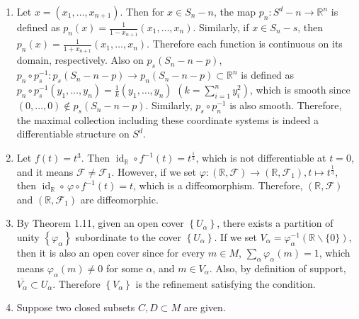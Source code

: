 \begin{enumerate}
\item Let $x=\left(x_{1}, \ldots, x_{n+1}\right)$. Then for $x \in S_{n}-n$, 
the map $p_{n}\colon S^{d}-n \rightarrow \mathbb{R}^{n}$ is defined as 
$p_{n}(x)=\frac{1}{1-x_{n+1}}\left(x_{1}, \ldots, x_{n}\right)$. 
Similarly, if $x \in S_{n}-s$, then $p_{n}(x)=\frac{1}{1+x_{n+1}}\left(x_{1}, \ldots, x_{n}\right)$. 
Therefore each function is continuous on its domain, respectively. 
Also on $p_{s}(S_{n}-n-p)$, $p_{n} \circ p_{s}^{-1}\colon p_{s}(S_{n}-n-p) \rightarrow p_{n}(S_{n}-n-p) \subset \mathbb{R}^{n}$ is defined as $p_{n} \circ p_{s}^{-1}(y_{1}, \ldots, y_{n})=\frac{1}{k}(y_{1}, \ldots, y_{n})$ $(k=\sum_{i=1}^{n} y_{i}^{2})$, 
which is smooth since $(0, \ldots, 0) \notin p_{s}(S_{n}-n-p)$. 
Similarly, $p_{s} \circ p_{n}^{-1}$ is also smooth.
Therefore, the maximal collection including these coordinate systems is indeed a differentiable structure on $S^{d}$.
\item Let $f(t)=t^{3}$. Then $\operatorname{id}_{\mathbb{R}} \circ f^{-1}(t)=t^{\frac{1}{3}}$, which is not differentiable at $t=0$, 
and it means $\mathscr{F} \neq \mathscr{F}_{1}$. 
However, if we set $\varphi\colon(\mathbb{R}, \mathscr{F}) \rightarrow\left(\mathbb{R}, \mathscr{F}_{1}\right), t \mapsto t^{\frac{1}{3}}$, 
then $\operatorname{id}_{\mathbb{R}} \circ \,\varphi \circ f^{-1}(t)=t$, which is a diffeomorphism. 
Therefore, $(\mathbb{R}, \mathscr{F})$ and $\left(\mathbb{R}, \mathscr{F}_{1}\right)$ are diffeomorphic.
\item By Theorem 1.11, given an open cover $\left\{U_{\alpha}\right\}$, 
there exists a partition of unity $\left\{\varphi_{\alpha}\right\}$ subordinate to the cover $\left\{U_{\alpha}\right\}$. 
If we set $V_{\alpha}=\varphi_{\alpha}^{-1}(\mathbb{R} \backslash\{0\})$, 
then it is also an open cover since for every $m \in M$, $\sum_{\alpha} \varphi_{\alpha}(m)=1$, 
which means $\varphi_{\alpha}(m) \neq 0$ for some $\alpha$, and $m \in V_{\alpha}$. 
Also, by definition of support, $\overline{V_{\alpha}} \subset U_{\alpha}$. 
Therefore $\left\{V_{\alpha}\right\}$ is the refinement satisfying the condition.
\item Suppose two closed subsets $C, D \subset M$ are given. 

\end{enumerate}
